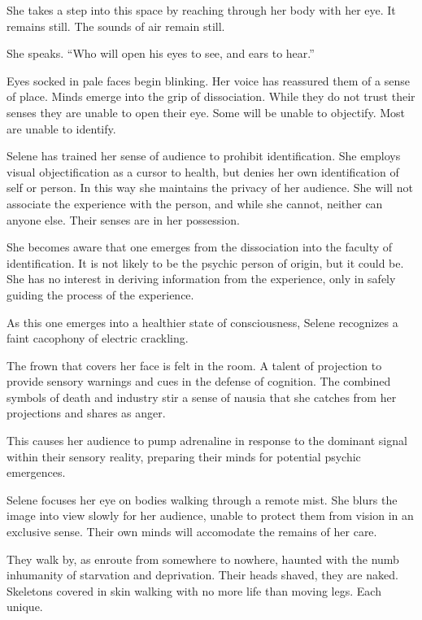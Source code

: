 \vfill
\break

She takes a step into this space by reaching through her body with her
eye.  It remains still.  The sounds of air remain still.  

She speaks.  ``Who will open his eyes to see, and ears to hear.''

Eyes socked in pale faces begin blinking.  Her voice has reassured
them of a sense of place.  Minds emerge into the grip of dissociation.
While they do not trust their senses they are unable to open their
eye.  Some will be unable to objectify.  Most are unable to identify.

\vfill
\break

Selene has trained her sense of audience to prohibit identification.
She employs visual objectification as a cursor to health, but denies
her own identification of self or person.  In this way she maintains
the privacy of her audience.  She will not associate the experience
with the person, and while she cannot, neither can anyone else.  Their
senses are in her possession.

She becomes aware that one emerges from the dissociation into the
faculty of identification.  It is not likely to be the psychic person
of origin, but it could be.  She has no interest in deriving
information from the experience, only in safely guiding the process of
the experience.

\vfill
\break

As this one emerges into a healthier state of consciousness, Selene
recognizes a faint cacophony of electric crackling.  

The frown that covers her face is felt in the room.  A talent of
projection to provide sensory warnings and cues in the defense of
cognition.  The combined symbols of death and industry stir a sense of
nausia that she catches from her projections and shares as anger.

This causes her audience to pump adrenaline in response to the
dominant signal within their sensory reality, preparing their minds
for potential psychic emergences.

Selene focuses her eye on bodies walking through a remote mist.  She
blurs the image into view slowly for her audience, unable to protect
them from vision in an exclusive sense.  Their own minds will
accomodate the remains of her care.

\vfill
\break

They walk by, as enroute from somewhere to \break nowhere, haunted
with the numb inhumanity of starvation and deprivation.  Their heads
shaved, they are naked.  Skeletons covered in skin walking with no
more life than moving legs.  Each unique.

